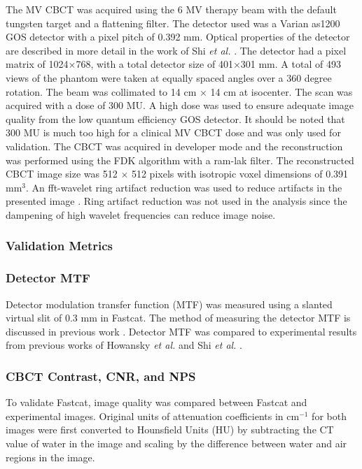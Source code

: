 The MV CBCT was acquired using the 6 MV therapy beam with the default tungsten target and a flattening filter. The detector used was a Varian as1200 GOS detector with a pixel pitch of 0.392 mm. Optical properties of the detector are described in more detail in the work of Shi \textit{et al.} \cite{Shi2018APerformance}. The detector had a pixel matrix of 1024$\times$768, with a total detector size of 401$\times$301 mm. A total of 493 views of the phantom were taken at equally spaced angles over a 360 degree rotation. The beam was collimated to 14 cm $\times$ 14 cm at isocenter. The scan was acquired with a dose of 300 MU. A high dose was used to ensure adequate image quality from the low quantum efficiency GOS detector. It should be noted that 300 MU is much too high for a clinical MV CBCT dose and was only used for validation. The CBCT was acquired in developer mode and the reconstruction was performed using the FDK algorithm with a ram-lak filter. The reconstructed CBCT image size was 512 $\times$ 512 pixels with isotropic voxel dimensions of 0.391 mm$^3$. An fft-wavelet ring artifact reduction was used to reduce artifacts in the presented image \cite{Munch2009StripeFiltering}. Ring artifact reduction was not used in the analysis since the dampening of high wavelet frequencies can reduce image noise.

\subsubsection{Validation Metrics}

\subsubsection{Detector MTF}

Detector modulation transfer function (MTF) was measured using a slanted virtual slit of 0.3 mm in Fastcat. The method of measuring the detector MTF is discussed in previous work \cite{OConnell2021FastCAT:Simulation}. Detector MTF was compared to experimental results from previous works of Howansky \textit{et al.} and Shi \textit{et al.} \cite{Howansky2017DirectImaging,Shi2018APerformance}.

\subsubsection{CBCT Contrast, CNR, and NPS}

To validate Fastcat, image quality was compared between Fastcat and experimental images. Original units of attenuation coefficients in cm$^{-1}$ for both images were first converted to Hounsfield Units (HU) by subtracting the CT value of water in the image and scaling by the difference between water and air regions in the image. 

